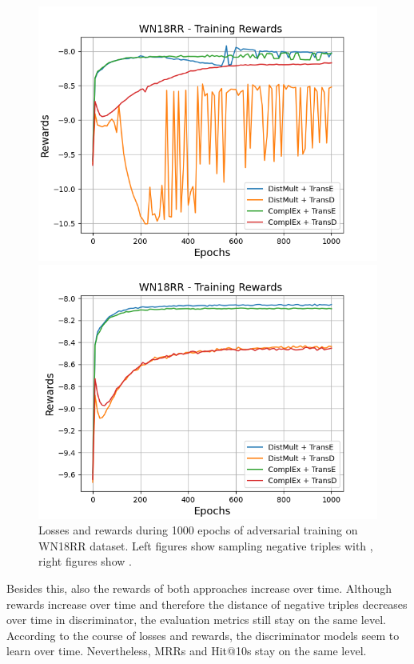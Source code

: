 \begin{figure}[H]
    \begin{minipage}{.5\textwidth}
      \centering
      \includegraphics[width=0.9\linewidth]{figures/results/gan_train/not_pretrained/uncertainty/max/entropy/wn18rr/1k_epochs/uncertainty_wn18rr_rew.png}
    \end{minipage}%
    \begin{minipage}{.5\textwidth}
      \centering
      \includegraphics[width=0.9\linewidth]{figures/results/gan_train/not_pretrained/uncertainty/max_distribution/entropy/wn18rr/1k_epochs/uncertainty_wn18rr_rew.png}
    \end{minipage}%
    \caption{Losses and rewards during 1000 epochs of adversarial training on \textsc{WN18RR} dataset. 
    Left figures show sampling negative triples with \usmax, right figures show \ussoftmax.}
    \label{fig:advtrain_wn18rr_usmax_ussoftmax_losses_rewards}
\end{figure}
Besides this, also the rewards of both approaches increase over time.
Although rewards increase over time and therefore the distance of negative triples decreases over time in discriminator, the evaluation metrics still stay on the same level.
According to the course of losses and rewards, the discriminator models seem to learn over time.
Nevertheless, MRRs and Hit@10s stay on the same level.
